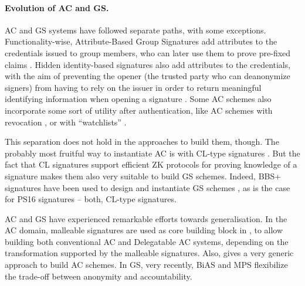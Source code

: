 \paragraph{Evolution of AC and GS.} %
AC and GS systems have followed separate paths, with some exceptions.
Functionality-wise, Attribute-Based Group Signatures add attributes to the
credentials issued to group members, who can later use them to prove pre-fixed
claims \cite{emo09,aa14}. Hidden identity-based signatures also add attributes
to the credentials, with the aim of preventing the opener (the trusted party who
can deanonymize signers) from having to rely on the issuer in order to return
meaningful identifying information when opening a signature \cite{ks07}. Some AC
schemes also incorporate some sort of utility after authentication, like
AC schemes with revocation \cite{cks10}, or with ``watchlists'' \needcite.

This separation does not hold in the approaches to build them, though. The
probably most fruitful way to instantiate AC is with CL-type signatures
\cite{cl02}. But the fact that CL signatures support efficient ZK protocols for
proving knowledge of a signature makes them also very suitable to build GS
schemes. Indeed, BBS+ signatures \cite{bbs04,cdl16b} have been used to design
and instantiate GS schemes \cite{gl19,dl21}, as is the case for PS16 signatures
\cite{ps16,cdl+20} -- both, CL-type signatures.

AC and GS have experienced remarkable efforts towards generalisation. In
the AC domain, malleable signatures are used as core building block in
\cite{cklm14}, to allow building both conventional AC and Delegatable AC
systems, depending on the transformation supported by the malleable signatures.
Also, \cite{ckl+15} gives a very generic approach to build AC schemes. In GS,
very recently, BiAS \cite{lnpy21} and MPS \cite{ngsy22} flexibilize the
trade-off between anonymity and accountability.

